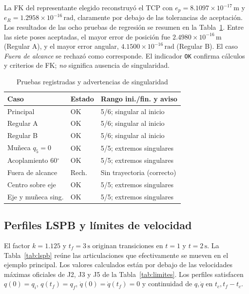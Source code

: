 \documentclass[conference,letterpaper]{IEEEtran}
\begin{document}
	La FK del representante elegido reconstruyó el TCP con \(e_p=8.1097\times10^{-17}\,\mathrm{m}\) y \(e_R=1.2958\times10^{-16}\,\mathrm{rad}\), claramente por debajo de las tolerancias de aceptación. Los resultados de las ocho pruebas de regresión se resumen en la Tabla~\ref{tab:regresion}. Entre las siete poses aceptadas, el mayor error de posición fue \(2.4980\times10^{-16}\,\mathrm{m}\) (Regular A), y el mayor error angular, \(4.1500\times10^{-16}\,\mathrm{rad}\) (Regular B). El caso \emph{Fuera de alcance} se rechazó como corresponde. El indicador \texttt{OK} confirma cálculos y criterios de FK; \emph{no} significa ausencia de singularidad.
	
	\begin{table}[!t]
		\caption{Pruebas registradas y advertencias de singularidad}
		\label{tab:regresion}
		\centering\scriptsize
		\begin{tabular}{@{}p{}lp{}@{}}
			\toprule
			Caso & Estado & Rango ini./fin. y aviso \\
			\midrule
			Principal & OK & 5/6; singular al inicio \\
			Regular A & OK & 5/6; singular al inicio \\
			Regular B & OK & 5/6; singular al inicio \\
			Muñeca $q_5=0$ & OK & 5/5; extremos singulares \\
			Acoplamiento 60$^\circ$ & OK & 5/5; extremos singulares \\
			Fuera de alcance & Rech. & Sin trayectoria (correcto) \\
			Centro sobre eje & OK & 5/5; extremos singulares \\
			Eje y muñeca sing. & OK & 5/5; extremos singulares \\
			\bottomrule
		\end{tabular}
	\end{table}
	
	\subsection{Perfiles LSPB y límites de velocidad}
	El factor \(k=1.125\) y \(t_f=3\,\mathrm{s}\) originan transiciones en \(t=1\) y \(t=2\,\mathrm{s}\). La Tabla~\ref{tab:lspb} reúne las articulaciones que efectivamente se mueven en el ejemplo principal. Los valores calculados están por debajo de las velocidades máximas oficiales de J2, J3 y J5 de la Tabla~\ref{tab:limites}. Los perfiles satisfacen \(q(0)=q_i\), \(q(t_f)=q_f\), \(\dot q(0)=\dot q(t_f)=0\) y continuidad de \(q,\dot q\) en \(t_c,t_f-t_c\).
	
\end{document}
